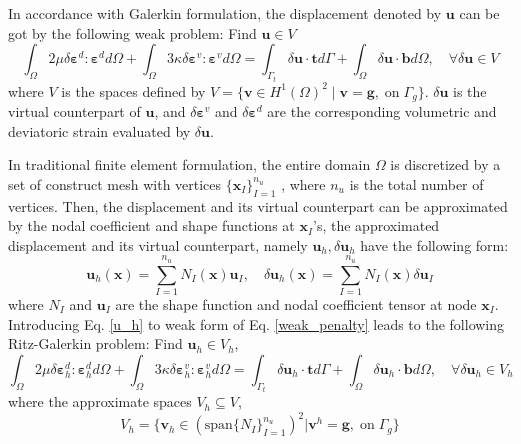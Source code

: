 In accordance with Galerkin formulation, the displacement denoted by $\boldsymbol u$ can be got by the following weak problem: 
Find $\boldsymbol u \in V$
\begin{equation}\label{weak_penalty}
\int_\Omega 2\mu \delta \boldsymbol \varepsilon^d : \boldsymbol \varepsilon^d d\Omega +
\int_\Omega 3\kappa \delta \boldsymbol \varepsilon^v : \boldsymbol \varepsilon^v d\Omega =
\int_{\Gamma_t} \delta \boldsymbol u \cdot \boldsymbol t d\Gamma + \int_\Omega \delta \boldsymbol u \cdot \boldsymbol b d\Omega, \quad
\forall \delta \boldsymbol u \in V
\end{equation}
where $V$ is the spaces defined by $V=\{\boldsymbol v \in H^1(\Omega)^2\;\vert\;\boldsymbol v = \boldsymbol g, \; \textrm{on} \; \Gamma_g\}$. $\delta \boldsymbol u$ is the virtual counterpart of $\boldsymbol u$, and $\delta \boldsymbol \varepsilon^v$ and $\delta \boldsymbol \varepsilon^d$ are the corresponding volumetric and deviatoric strain evaluated by $\delta \boldsymbol u$.

In traditional finite element formulation, the entire domain $\Omega$ is discretized by a set of construct mesh with vertices $\{\boldsymbol x_I\}_{I=1}^{n_u}$ \cite{hughes2000}, where $n_u$ is the total number of vertices. Then, the displacement and its virtual counterpart can be approximated by the nodal coefficient and shape functions at $\boldsymbol x_I$'s, the approximated displacement and its virtual counterpart, namely $\boldsymbol u_h, \delta \boldsymbol u_h$ have the following form: 
\begin{equation}\label{u_h}
\boldsymbol u_h(\boldsymbol x) = \sum_{I=1}^{n_u} N_I(\boldsymbol x) \boldsymbol u_I, \quad
\delta \boldsymbol u_h(\boldsymbol x) = \sum_{I=1}^{n_u} N_I(\boldsymbol x) \delta \boldsymbol u_I
\end{equation}
where $N_I$ and $\boldsymbol u_I$ are the shape function and nodal coefficient tensor at node $\boldsymbol x_I$.
Introducing Eq. \eqref{u_h} to weak form of Eq. \eqref{weak_penalty} leads to the following Ritz-Galerkin problem:
Find $\boldsymbol u_h \in V_h$,
\begin{equation}\label{ritz_penalty}
\int_\Omega 2\mu \delta \boldsymbol \varepsilon^d_h : \boldsymbol \varepsilon^d_h d\Omega +
\int_\Omega 3\kappa \delta \boldsymbol \varepsilon^v_h : \boldsymbol \varepsilon^v_h d\Omega =
\int_{\Gamma_t} \delta \boldsymbol u_h \cdot \boldsymbol t d\Gamma + \int_\Omega \delta \boldsymbol u_h \cdot \boldsymbol b d\Omega, \quad
\forall \delta \boldsymbol u_h \in V_h
\end{equation}
where the approximate spaces $V_h \subseteq V$,
\begin{equation}
V_h = \{\boldsymbol v_h \in (\mathrm{span}\{N_I\}_{I=1}^{n_u})^2 \vert \boldsymbol v^h = \boldsymbol g,\; \mathrm{on} \; \Gamma_g\}
\end{equation}

